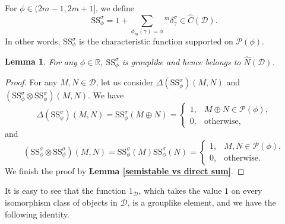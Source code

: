 \documentclass[a4paper,12pt]{amsart}
\newtheorem{lemma}[theorem]{Lemma}
\newcommand{\Ss}{\mathrm{SS}}
\begin{document}
For $\phi\in(2m-1,2m+1]$, we define
\[\Ss^\sigma_\phi=1+\sum_{\phi_m(\gamma)=\phi}{^m}\delta^\sigma_\gamma\in\hat{C}(\mathcal{D}).\]
In other words, $\Ss^\sigma_\phi$ is the characteristic function supported on $\mathcal{P}(\phi)$.
\begin{lemma}\label{SS grouplike}
    For any $\phi\in\mathbb{R}$, $\Ss^\sigma_\phi$ is grouplike and hence belongs to $\hat{N}(\mathcal{D})$.
\end{lemma}
\begin{proof}
    For any $M,N\in\mathcal{D}$, let us consider $\Delta(\Ss^\sigma_\phi)(M,N)$ and $(\Ss^\sigma_\phi\otimes\Ss^\sigma_\phi)(M,N)$. We have
    \[\Delta(\Ss^\sigma_\phi)(M,N)=\Ss^\sigma_\phi(M\oplus N)=\begin{cases}
        1,&M\oplus N\in\mathcal{P}(\phi),\\
        0,&\text{otherwise},
    \end{cases}\]
    and
    \[(\Ss^\sigma_\phi\otimes\Ss^\sigma_\phi)(M,N)=\Ss^\sigma_\phi(M)\Ss^\sigma_\phi(N)=\begin{cases}
        1,&M,N\in\mathcal{P}(\phi),\\
        0,&\text{otherwise}.
    \end{cases}\]
    We finish the proof by \textbf{Lemma \ref{semistable vs direct sum}}.
\end{proof}
It is easy to see that the function $1_\mathcal{D}$, which takes the value $1$ on every isomorphism class of objects in $\mathcal{D}$, is a grouplike element, and we have the following identity.
\end{document}
